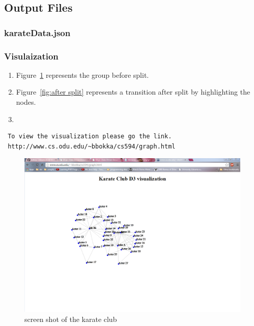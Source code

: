\documentclass[12pt]{article}
\begin{document}
\subsection{Output Files}
\subsubsection{karateData.json}

\newpage
\subsubsection{Visulaization}
\begin{enumerate}
	\item Figure~\ref{fig:before split} represents the group before split.
	\item Figure~\ref{fig:after split} represents a transition after split by highlighting the nodes.
	\item
\end{enumerate}
\begin{verbatim}
 To view the visualization please go the link.
 http://www.cs.odu.edu/~bbokka/cs594/graph.html
\end{verbatim}
\begin{figure}[ht]
\includegraphics[scale=0.6]{../beforeSplit}
\centering
\caption{screen shot of the karate club}
\label{fig:before split}
\end{figure}
\newpage
\end{document}
